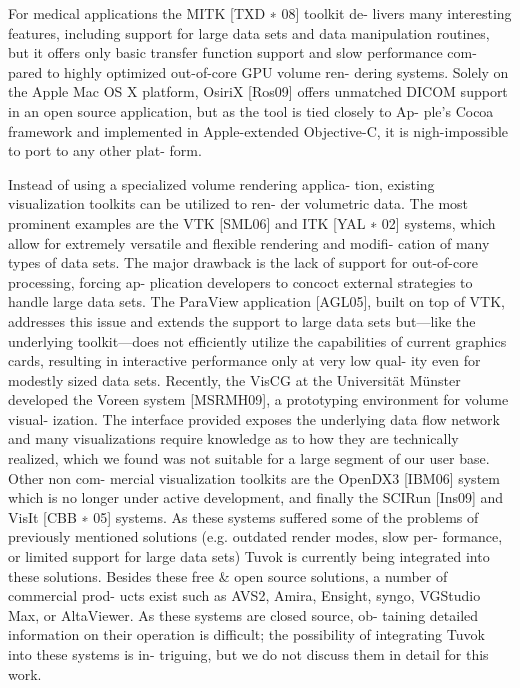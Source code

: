 For medical applications the MITK [TXD ∗ 08] toolkit de-
livers many interesting features, including support for large
data sets and data manipulation routines, but it offers only
basic transfer function support and slow performance com-
pared to highly optimized out-of-core GPU volume ren-
dering systems. Solely on the Apple Mac OS X platform,
OsiriX [Ros09] offers unmatched DICOM support in an
open source application, but as the tool is tied closely to Ap-
ple’s Cocoa framework and implemented in Apple-extended
Objective-C, it is nigh-impossible to port to any other plat-
form.

Instead of using a specialized volume rendering applica-
tion, existing visualization toolkits can be utilized to ren-
der volumetric data. The most prominent examples are the
VTK [SML06] and ITK [YAL ∗ 02] systems, which allow
for extremely versatile and flexible rendering and modifi-
cation of many types of data sets. The major drawback is
the lack of support for out-of-core processing, forcing ap-
plication developers to concoct external strategies to handle
large data sets. The ParaView application [AGL05], built on
top of VTK, addresses this issue and extends the support to
large data sets but—like the underlying toolkit—does not
efficiently utilize the capabilities of current graphics cards,
resulting in interactive performance only at very low qual-
ity even for modestly sized data sets. Recently, the VisCG
at the Universität Münster developed the Voreen system
[MSRMH09], a prototyping environment for volume visual-
ization. The interface provided exposes the underlying data
flow network and many visualizations require knowledge as
to how they are technically realized, which we found was not
suitable for a large segment of our user base. Other non com-
mercial visualization toolkits are the OpenDX3 [IBM06]
system which is no longer under active development, and
finally the SCIRun [Ins09] and VisIt [CBB ∗ 05] systems. As
these systems suffered some of the problems of previously
mentioned solutions (e.g. outdated render modes, slow per-
formance, or limited support for large data sets) Tuvok is
currently being integrated into these solutions. Besides these
free \& open source solutions, a number of commercial prod-
ucts exist such as AVS2, Amira, Ensight, syngo, VGStudio
Max, or AltaViewer. As these systems are closed source, ob-
taining detailed information on their operation is difficult;
the possibility of integrating Tuvok into these systems is in-
triguing, but we do not discuss them in detail for this work.

